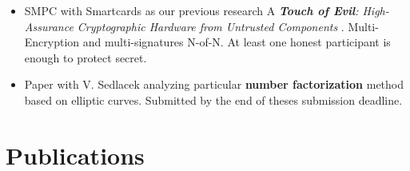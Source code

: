 \documentclass[
  digital, %
  twoside, %
  table,   %
  lof,     %
  lot,     %
]{fithesis3}
\newcounter{ph4_show_guides}
\theoremstyle{definition}
\theoremstyle{remark}
\begin{document}
\begin{ecmmnt}
\begin{itemize}
	\item SMPC with Smartcards as our previous research A {\it {\bf{Touch of Evil}}: High-Assurance Cryptographic Hardware from Untrusted Components} \cite{2017-ccs-mavroudis}. Multi-Encryption and multi-signatures N-of-N. At least one honest participant is enough to protect secret.
	
	\item Paper with V. Sedlacek analyzing particular {\bf{number factorization}} method based on elliptic curves. Submitted by the end of theses submission deadline.
	
\end{itemize}
\end{ecmmnt} 

\section{Publications}\label{sec:res:pubs}

\newcommand{\citemypub}[1]{\cite{#1}: \fullcite{#1}.\newline}
\end{document}
